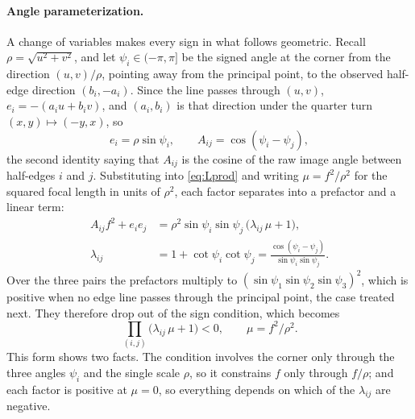 \documentclass[pdflatex,sn-mathphys-num,iicol]{sn-jnl}
\theoremstyle{thmstyleone}
\theoremstyle{thmstylethree}
\theoremstyle{thmstyletwo}
\begin{document}
\paragraph{Angle parameterization.} A change of variables makes every sign in what follows geometric. Recall $\rho=\sqrt{u^2+v^2}$, and let $\psi_i\in(-\pi,\pi]$ be the signed angle at the corner from the direction $(u,v)/\rho$, pointing away from the principal point, to the observed half-edge direction $(b_i,-a_i)$. Since the line passes through $(u,v)$, $e_i=-(a_iu+b_iv)$, and $(a_i,b_i)$ is that direction under the quarter turn $(x,y)\mapsto(-y,x)$, so
\begin{equation}
e_i=\rho\sin\psi_i,\qquad A_{ij}=\cos(\psi_i-\psi_j),
\label{eq:psi}
\end{equation}
the second identity saying that $A_{ij}$ is the cosine of the raw image angle between half-edges $i$ and $j$. Substituting into \eqref{eq:Lprod} and writing $\mu=f^2/\rho^2$ for the squared focal length in units of $\rho^2$, each factor separates into a prefactor and a linear term:
\begin{equation}
\begin{aligned}
A_{ij}f^2+e_ie_j&=\rho^2\sin\psi_i\sin\psi_j\,\bigl(\lambda_{ij}\,\mu+1\bigr),\\
\lambda_{ij}&=1+\cot\psi_i\cot\psi_j=\frac{\cos(\psi_i-\psi_j)}{\sin\psi_i\sin\psi_j}.
\end{aligned}
\label{eq:lambda}
\end{equation}
Over the three pairs the prefactors multiply to $(\sin\psi_1\sin\psi_2\sin\psi_3)^2$, which is positive when no edge line passes through the principal point, the case treated next. They therefore drop out of the sign condition, which becomes
\begin{equation}
\prod_{(i,j)}\bigl(\lambda_{ij}\,\mu+1\bigr)<0,\qquad \mu=f^2/\rho^2.
\label{eq:mu}
\end{equation}
This form shows two facts. The condition involves the corner only through the three angles $\psi_i$ and the single scale $\rho$, so it constrains $f$ only through $f/\rho$; and each factor is positive at $\mu=0$, so everything depends on which of the $\lambda_{ij}$ are negative.
\end{document}
